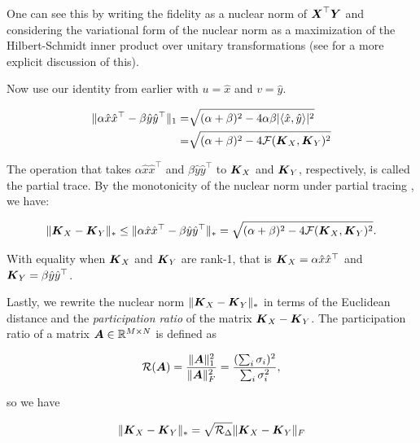 One can see this by writing the fidelity as a nuclear norm of $\boldsymbol{X}^\top \boldsymbol{Y}$ and considering the variational form of the nuclear norm as a maximization of the Hilbert-Schmidt inner product over unitary transformations (see \cite{Harvey2024} for a more explicit discussion of this).  


Now use our identity from earlier with $u = \hat{x}$ and $v =\hat{y} $.  

\begin{equation}
\begin{split}
    \| \alpha \hat{x} \hat{x}^{\top} - \beta \hat{y} \hat{y}^{\top} \|_1 =& \sqrt{(\alpha + \beta)^2 - 4 \alpha \beta \lvert \langle \hat{x},\hat{y} \rangle \lvert^2}\\
    =& \sqrt{(\alpha + \beta)^2 - 4 \mathcal{F}(\boldsymbol{K}_X,\boldsymbol{K}_Y)^2}
    \end{split}
\end{equation}

The operation that takes $\alpha \hat{x} \hat{x}^{\top}$ and $\beta \hat{y} \hat{y}^{\top}$ to $\boldsymbol{K}_X$ and $\boldsymbol{K}_Y$, respectively, is called the partial trace.  
By the monotonicity of the nuclear norm under partial tracing \cite{watrous2018}, we have: 

\begin{equation}\label{eq:nucnorm-inequality}
    \| \boldsymbol{K}_X-\boldsymbol{K}_Y \|_*  \le \| \alpha \hat{x} \hat{x}^{\top} - \beta \hat{y} \hat{y}^{\top} \|_* = \sqrt{(\alpha + \beta)^2 - 4 \mathcal{F}(\boldsymbol{K}_X,\boldsymbol{K}_Y)^2}.
\end{equation}

With equality when $\boldsymbol{K}_X$ and $\boldsymbol{K}_Y$ are rank-1, that is $\boldsymbol{K}_X = \alpha \hat{x} \hat{x}^{\top} $ and $\boldsymbol{K}_Y = \beta \hat{y} \hat{y}^{\top}$.

Lastly, we rewrite the nuclear norm $\| \boldsymbol{K}_X-\boldsymbol{K}_Y \|_*$ in terms of the Euclidean distance and the \emph{participation ratio} of the matrix $\boldsymbol{K}_X - \boldsymbol{K}_Y$.
The participation ratio of a matrix $\boldsymbol{A} \in \mathbb{R}^{M\times N}$ is defined as

\begin{equation}\label{eq:pr-def}
    \mathcal{R}(\boldsymbol{A}) = \frac{\| \boldsymbol{A} \|_{1}^{2} }{\| \boldsymbol{A} \|_F^2} = \frac{(\sum_i \sigma_i)^2}{\sum_i \sigma_i^2},
\end{equation}

so we have 

\begin{equation}\label{eq:nucnorm-pr}
    \| \boldsymbol{K}_X-\boldsymbol{K}_Y \|_* = \sqrt{\mathcal{R}_\Delta} \| \boldsymbol{K}_X-\boldsymbol{K}_Y \|_F
\end{equation}

